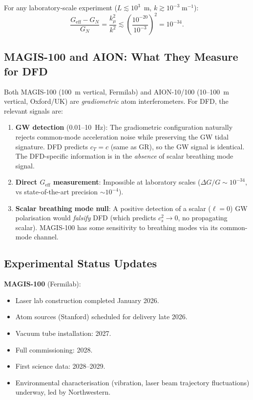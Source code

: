 \documentclass[11pt]{article}
\theoremstyle{definition}
\theoremstyle{remark}
\newcommand{\Geff}{G_{\mathrm{eff}}}
\begin{document}
For any laboratory-scale experiment ($L \lesssim 10^3$~m,
$k \gtrsim 10^{-3}\;\mathrm{m}^{-1}$):
\begin{equation}
\frac{\Geff - G_N}{G_N} = \frac{k_\mu^2}{k^2}
  \lesssim \left(\frac{10^{-20}}{10^{-3}}\right)^2
  = 10^{-34}.
\end{equation}

\subsection{MAGIS-100 and AION: What They Measure for DFD}

Both MAGIS-100 (100~m vertical, Fermilab) and AION-10/100
(10--100~m vertical, Oxford/UK) are \emph{gradiometric}
atom interferometers.  For DFD, the relevant signals are:
\begin{enumerate}[nosep]
\item \textbf{GW detection} (0.01--10~Hz): The gradiometric
  configuration naturally rejects common-mode acceleration
  noise while preserving the GW tidal signature.
  DFD predicts $c_T = c$ (same as GR), so the GW signal
  is identical.  The DFD-specific information is in the
  \emph{absence} of scalar breathing mode signal.
\item \textbf{Direct $\Geff$ measurement}: Impossible
  at laboratory scales ($\Delta G/G \sim 10^{-34}$, vs
  state-of-the-art precision $\sim 10^{-4}$).
\item \textbf{Scalar breathing mode null}: A positive
  detection of a scalar ($\ell = 0$) GW polarisation
  would \emph{falsify} DFD (which predicts $c_s^2 \to 0$,
  no propagating scalar).  MAGIS-100 has some sensitivity
  to breathing modes via its common-mode channel.
\end{enumerate}

\subsection{Experimental Status Updates}

\textbf{MAGIS-100} (Fermilab):
\begin{itemize}[nosep]
\item Laser lab construction completed January 2026.
\item Atom sources (Stanford) scheduled for delivery late 2026.
\item Vacuum tube installation: 2027.
\item Full commissioning: 2028.
\item First science data: 2028--2029.
\item Environmental characterisation (vibration, laser beam
  trajectory fluctuations) underway, led by Northwestern.
\end{itemize}
\end{document}
